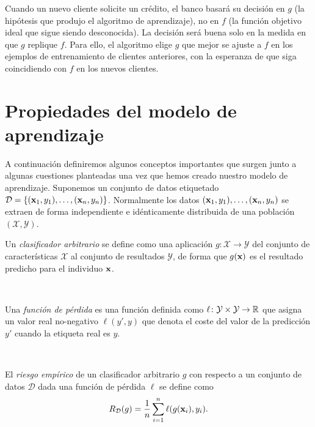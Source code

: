 \documentclass[oneside,openright,titlepage,numbers=noenddot,openany,headinclude,footinclude=true,
cleardoublepage=empty,abstractoff,BCOR=5mm,paper=a4,fontsize=12pt,main=spanish]{scrreprt}
\begin{document}
\clearpage

Cuando un nuevo cliente solicite un crédito, el banco basará su decisión en $g$ (la hipótesis que produjo el algoritmo de aprendizaje), no en $f$ (la
función objetivo ideal que sigue siendo desconocida). La decisión será buena solo en la medida en que $g$ replique $f$. Para ello, el algoritmo elige $g$ que mejor se ajuste a $f$ en los ejemplos de entrenamiento de clientes anteriores, con la esperanza de que siga coincidiendo con $f$ en los nuevos clientes.

\section{Propiedades del modelo de aprendizaje}

A continuación definiremos algunos conceptos importantes que surgen junto a algunas cuestiones planteadas una vez que hemos creado nuestro modelo de aprendizaje. Suponemos un conjunto de datos etiquetado $\mathcal{D}=\{(\textbf{x}_1,y_1),\dots,(\textbf{x}_n,y_n)\}$. Normalmente los datos $(\textbf{x}_1, y_1),\dots, (\textbf{x}_n, y_n)$ se extraen de forma independiente e idénticamente distribuida de una población $(\mathcal{X},\mathcal{Y})$.\\

\begin{definition}
Un \textit{clasificador arbitrario} se define como una aplicación $g\colon \mathcal{X} \to \mathcal{Y}$ del conjunto de características $\mathcal{X}$ al conjunto de resultados $\mathcal{Y}$, de forma que $ g(\textbf{x})$ es el resultado predicho para el individuo $\textbf{x}$.
\end{definition}\

\begin{definition}
Una \textit{función de pérdida} es una función definida como $\ell \colon \mathcal{Y} \times \mathcal{Y} \to \mathbb{R}$ que asigna un valor real no-negativo $\ell(y',y)$ que denota el coste del valor de la predicción $y'$ cuando la etiqueta real es $y$.
\end{definition}\

\begin{definition}
El \textit{riesgo empírico} de un clasificador arbitrario $g$ con respecto a un conjunto de datos $\mathcal{D}$ dada una función de pérdida $\ell$ se define como $$R_{\mathcal{D}}(g)=\frac{1}{n}\sum_{i=1}^n \ell(g(\textbf{x}_i),y_i).$$
\end{definition}\
\end{document}
